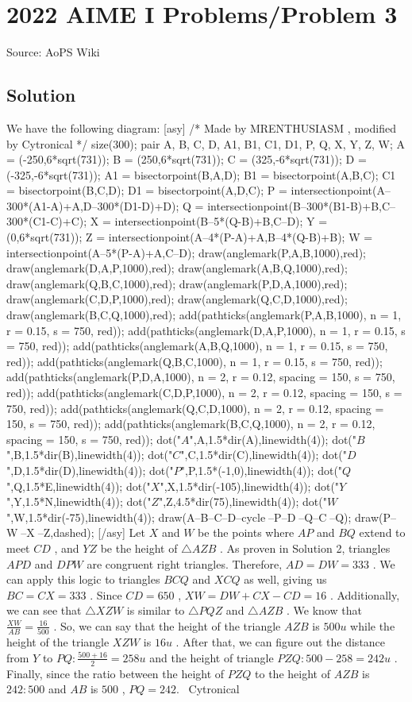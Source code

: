 \documentclass[12pt]{article}
\begin{document}
\section*{{2022 AIME I Problems/Problem 3}}
Source: AoPS Wiki

\subsection*{Solution}
We have the following diagram: [asy] /* Made by MRENTHUSIASM , modified by Cytronical */ size(300); pair A, B, C, D, A1, B1, C1, D1, P, Q, X, Y, Z, W; A = (-250,6*sqrt(731)); B = (250,6*sqrt(731)); C = (325,-6*sqrt(731)); D = (-325,-6*sqrt(731)); A1 = bisectorpoint(B,A,D); B1 = bisectorpoint(A,B,C); C1 = bisectorpoint(B,C,D); D1 = bisectorpoint(A,D,C); P = intersectionpoint(A--300*(A1-A)+A,D--300*(D1-D)+D); Q = intersectionpoint(B--300*(B1-B)+B,C--300*(C1-C)+C); X = intersectionpoint(B--5*(Q-B)+B,C--D); Y = (0,6*sqrt(731)); Z = intersectionpoint(A--4*(P-A)+A,B--4*(Q-B)+B); W = intersectionpoint(A--5*(P-A)+A,C--D); draw(anglemark(P,A,B,1000),red); draw(anglemark(D,A,P,1000),red); draw(anglemark(A,B,Q,1000),red); draw(anglemark(Q,B,C,1000),red); draw(anglemark(P,D,A,1000),red); draw(anglemark(C,D,P,1000),red); draw(anglemark(Q,C,D,1000),red); draw(anglemark(B,C,Q,1000),red); add(pathticks(anglemark(P,A,B,1000), n = 1, r = 0.15, s = 750, red)); add(pathticks(anglemark(D,A,P,1000), n = 1, r = 0.15, s = 750, red)); add(pathticks(anglemark(A,B,Q,1000), n = 1, r = 0.15, s = 750, red)); add(pathticks(anglemark(Q,B,C,1000), n = 1, r = 0.15, s = 750, red)); add(pathticks(anglemark(P,D,A,1000), n = 2, r = 0.12, spacing = 150, s = 750, red)); add(pathticks(anglemark(C,D,P,1000), n = 2, r = 0.12, spacing = 150, s = 750, red)); add(pathticks(anglemark(Q,C,D,1000), n = 2, r = 0.12, spacing = 150, s = 750, red)); add(pathticks(anglemark(B,C,Q,1000), n = 2, r = 0.12, spacing = 150, s = 750, red)); dot("$A$",A,1.5*dir(A),linewidth(4)); dot("$B$",B,1.5*dir(B),linewidth(4)); dot("$C$",C,1.5*dir(C),linewidth(4)); dot("$D$",D,1.5*dir(D),linewidth(4)); dot("$P$",P,1.5*(-1,0),linewidth(4)); dot("$Q$",Q,1.5*E,linewidth(4)); dot("$X$",X,1.5*dir(-105),linewidth(4)); dot("$Y$",Y,1.5*N,linewidth(4)); dot("$Z$",Z,4.5*dir(75),linewidth(4)); dot("$W$",W,1.5*dir(-75),linewidth(4)); draw(A--B--C--D--cycle^^A--P--D^^B--Q--C^^P--Q); draw(P--W^^Q--X^^Y--Z,dashed); [/asy] Let $X$ and $W$ be the points where $AP$ and $BQ$ extend to meet $CD$ , and $YZ$ be the height of $\triangle AZB$ . As proven in Solution 2, triangles $APD$ and $DPW$ are congruent right triangles. Therefore, $AD = DW = 333$ . We can apply this logic to triangles $BCQ$ and $XCQ$ as well, giving us $BC = CX = 333$ . Since $CD = 650$ , $XW = DW + CX - CD = 16$ . Additionally, we can see that $\triangle XZW$ is similar to $\triangle PQZ$ and $\triangle AZB$ . We know that $\frac{XW}{AB} = \frac{16}{500}$ . So, we can say that the height of the triangle $AZB$ is $500u$ while the height of the triangle $XZW$ is $16u$ . After that, we can figure out the distance from $Y$ to $PQ: \frac{500+16}{2} = 258u$ and the height of triangle $PZQ: 500-258 = 242u$ . Finally, since the ratio between the height of $PZQ$ to the height of $AZB$ is $242:500$ and $AB$ is $500$ , $PQ = \boxed{242}.$ ~Cytronical
\end{document}
